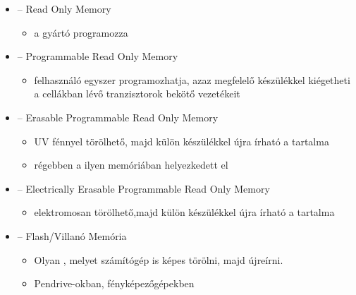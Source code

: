 \documentclass[../main.tex]{subfiles}
\begin{document}
\begin{itemize}
  \item {} \tabto{1.7cm} – \tabto{2.5cm}
        Read Only Memory
        \begin{itemize}
          \item a gyártó programozza
        \end{itemize}

  \item {} \tabto{1.7cm} – \tabto{2.5cm}
        Programmable Read Only Memory
        \begin{itemize}
          \item felhasználó egyszer programozhatja,
                azaz megfelelő készülékkel kiégetheti
                a cellákban lévő tranzisztorok bekötő vezetékeit
        \end{itemize}

  \item {} \tabto{1.7cm} – \tabto{2.5cm}
        Erasable Programmable Read Only Memory
        \begin{itemize}
          \item UV fénnyel törölhető, majd külön
                készülékkel újra írható a tartalma

          \item régebben a  ilyen
                memóriában helyezkedett el
        \end{itemize}

  \item {} \tabto{1.7cm} – \tabto{2.5cm}
        Electrically Erasable Programmable Read Only Memory
        \begin{itemize}
          \item elektromosan törölhető,majd külön
                készülékkel újra írható a tartalma
        \end{itemize}

  \item {} \tabto{1.7cm} – \tabto{2.5cm}
        Flash/Villanó Memória
        \begin{itemize}
          \item Olyan , melyet számítógép
                is képes törölni, majd újreírni.

          \item Pendrive-okban, fényképezőgépekben
        \end{itemize}
\end{itemize}
\end{document}
